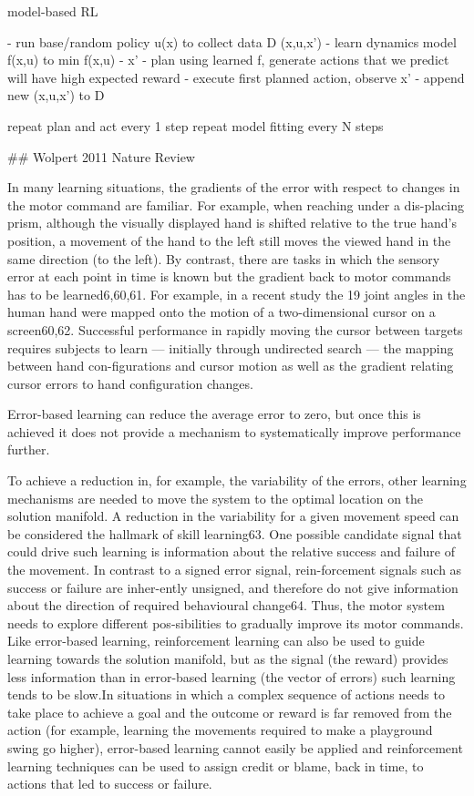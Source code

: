 \documentclass[../main.tex]{subfiles}
\begin{document}
{{model-based RL

- run base/random policy u(x) to collect data D (x,u,x')
- learn dynamics model f(x,u) to min f(x,u) - x'
- plan using learned f, generate actions that we predict will have high expected reward
- execute first planned action, observe x'
- append new (x,u,x') to D

repeat plan and act every 1 step
repeat model fitting every N steps

## Wolpert 2011 Nature Review

In many learning situations, the gradients of the error with respect to changes in the motor command are familiar. For example, when reaching under a dis-placing prism, although the visually displayed hand is shifted relative to the true hand’s position, a movement of the hand to the left still moves the viewed hand in the same direction (to the left). By contrast, there are tasks in which the sensory error at each point in time is known but the gradient back to motor commands has to be learned6,60,61. For example, in a recent study the 19 joint angles in the human hand were mapped onto the motion of a two-dimensional cursor on a screen60,62. Successful performance in rapidly moving the cursor between targets requires subjects to learn — initially through undirected search — the mapping between hand con-figurations and cursor motion as well as the gradient relating cursor errors to hand configuration changes.

Error-based  learning  can  reduce the average error to zero, but once this is achieved it  does  not  provide  a  mechanism  to  systematically  improve performance further.

To achieve a reduction in, for example, the variability of the errors, other learning mechanisms are needed to move the system to the optimal location on the solution manifold. A reduction in the variability for a given movement speed can be considered the hallmark of skill learning63. One possible candidate signal that could drive such learning is information about the relative success and failure of the movement. In contrast to a signed error signal, rein-forcement signals such as success or failure are inher-ently unsigned, and therefore do not give information about the direction of required behavioural change64. Thus, the motor system needs to explore different pos-sibilities to gradually improve its motor commands. Like error-based learning, reinforcement learning can also be used to guide learning towards the solution manifold, but as the signal (the reward) provides less information than in error-based learning (the vector of errors) such learning tends to be slow.In situations in which a complex sequence of actions needs to take place to achieve a goal and the outcome or reward is far removed from the action (for example, learning the movements required to make a playground swing go higher), error-based learning cannot easily be applied and reinforcement learning techniques can be used to assign credit or blame, back in time, to actions that led to success or failure.

}}
\end{document}
